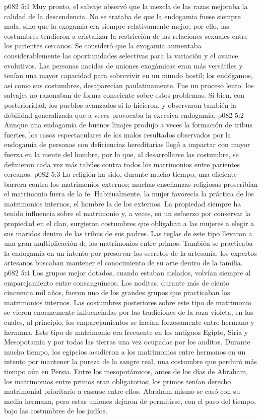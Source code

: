 \vs p082 5:1 Muy pronto, el salvaje observó que la mezcla de las razas mejoraba la calidad de la descendencia. No se trataba de que la endogamia fuese siempre mala, sino que la exogamia era siempre relativamente mejor; por ello, las costumbres tendieron a cristalizar la restricción de las relaciones sexuales entre los parientes cercanos. Se consideró que la exogamia aumentaba considerablemente las oportunidades selectivas para la variación y el avance evolutivos. Las personas nacidas de uniones exogámicas eran más versátiles y tenían una mayor capacidad para sobrevivir en un mundo hostil; los endógamos, así como sus costumbres, desaparecían paulatinamente. Fue un proceso lento; los salvajes no razonaban de forma consciente sobre estos problemas. Si bien, con posterioridad, los pueblos avanzados sí lo hicieron, y observaron también la debilidad generalizada que a veces provocaba la excesiva endogamia.
\vs p082 5:2 Aunque una endogamia de buenos linajes produjo a veces la formación de tribus fuertes, los casos espectaculares de los malos resultados observados por la endogamia de personas con deficiencias hereditarias llegó a impactar con mayor fuerza en la mente del hombre, por lo que, al desarrollarse las costumbre, se definieron cada vez más tabúes contra todos los matrimonios entre parientes cercanos.
\vs p082 5:3 \pc La religión ha sido, durante mucho tiempo, una eficiente barrera contra los matrimonios externos; muchas enseñanzas religiosas proscribían el matrimonio fuera de la fe. Habitualmente, la mujer favorecía la práctica de los matrimonios internos, el hombre la de los externos. La propiedad siempre ha tenido influencia sobre el matrimonio y, a veces, en un esfuerzo por conservar la propiedad en el clan, surgieron costumbres que obligaban a las mujeres a elegir a sus maridos dentro de las tribus de sus padres. Las reglas de este tipo llevaron a una gran multiplicación de los matrimonios entre primos. También se practicaba la endogamia en un intento por preservar los secretos de la artesanía; los expertos artesanos buscaban mantener el conocimiento de su arte dentro de la familia.
\vs p082 5:4 \pc Los grupos mejor dotados, cuando estaban aislados, volvían siempre al emparejamiento entre consanguíneos. Los noditas, durante más de ciento cincuenta mil años, fueron uno de los grandes grupos que practicaban los matrimonios internos. Las costumbres posteriores sobre este tipo de matrimonio se vieron enormemente influenciadas por las tradiciones de la raza violeta, en las cuales, al principio, los emparejamientos se hacían forzosamente entre hermano y hermana. Este tipo de matrimonio era frecuente en los antiguos Egipto, Siria y Mesopotamia y por todas las tierras una vez ocupadas por los anditas. Durante mucho tiempo, los egipcios acudieron a los matrimonios entre hermanos en un intento por mantener la pureza de la sangre real, una costumbre que perduró más tiempo aún en Persia. Entre los mesopotámicos, antes de los días de Abraham, los matrimonios entre primos eran obligatorios; los primos tenían derecho matrimonial prioritario a casarse entre ellos. Abraham mismo se casó con su media hermana, pero estas uniones dejaron de permitirse, con el paso del tiempo, bajo las costumbres de los judíos.
